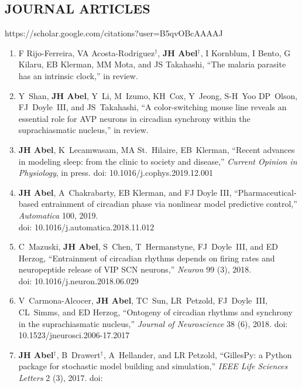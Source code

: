 \documentclass[line,10pt]{res}
\begin{document}
\begin{resume}
\section{\bf JOURNAL ARTICLES}
\vspace{0.5em}
https://scholar.google.com/citations?user=B5qvOBcAAAAJ
\vspace{1em}
\begin{enumerate}
    \setlength\itemsep{0.8em}
    \item F Rijo-Ferreira, VA Acosta-Rodriguez$^\dagger$, \textbf{JH Abel}$^\dagger$, I Kornblum, I Bento, G Kilaru, EB Klerman, MM Mota, and JS Takahashi, ``The malaria parasite has an intrinsic clock,'' in review.
    \item Y~Shan, \textbf{JH Abel}, Y~Li, M~Izumo, KH~Cox, Y~Jeong, {S-H}~Yoo DP~Olson, FJ~Doyle~III, and JS~Takahashi, ``A color-switching mouse line reveals an essential role for AVP neurons in circadian synchrony within the suprachiasmatic nucleus,'' in review.
        \item \textbf{JH Abel}, K~Lecamwasam, MA St.\ Hilaire, EB~Klerman, ``Recent advances in modeling sleep: from the clinic to society and disease,'' 
    \textit{Current Opinion in Physiology}, 
    in press. doi: 10.1016/j.cophys.2019.12.001
    \item \textbf{JH Abel}, A~Chakrabarty, EB Klerman, and FJ Doyle III, ``Pharmaceutical-based entrainment of circadian phase via nonlinear model predictive
	    control,'' \textit{Automatica} 100, 2019. \\doi: %
    10.1016/j.automatica.2018.11.012%
    \item C~Mazuski, \textbf{JH Abel}, S~Chen, T~Hermanstyne, FJ~Doyle~III, and ED Herzog, ``Entrainment of circadian rhythms depends on firing rates and neuropeptide release of VIP SCN neurons,'' \textit{Neuron} 99 (3), 2018.\\ doi: %
    10.1016/j.neuron.2018.06.029%
    \item V~Carmona-Alcocer, \textbf{JH Abel}, TC~Sun, LR~Petzold, FJ~Doyle~III, CL~Simms, and ED Herzog, ``Ontogeny of circadian rhythms and synchrony in the suprachiasmatic nucleus,'' \textit{Journal of Neuroscience} 38 (6), 2018. doi: %
    10.1523/jneurosci.2006-17.2017%
    \item \textbf{JH Abel}$^\dagger$, B~Drawert$^\dagger$, A~Hellander, and LR Petzold, ``GillesPy: a Python package for stochastic model building and simulation,'' \textit{IEEE Life Sciences Letters} 2 (3), 2017. doi: %

\end{enumerate}
\end{resume}
\end{document}

